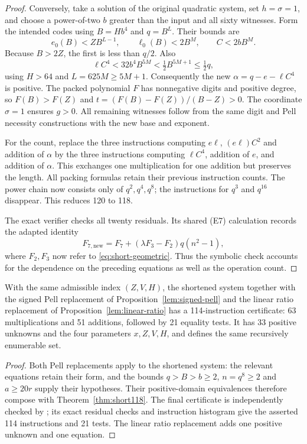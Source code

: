 \begin{proof}
Conversely, take a solution of the original quadratic system, set
$h=\sigma=1$, and choose a power-of-two $b$ greater than the input and
all sixty witnesses. Form the intended codes using $B=Hb^4$ and
$q=B^L$. Their bounds are
\[
 e_0(B)<ZB^{L-1},\qquad \ell_0(B)<2B^M,
 \qquad C<2bB^M.
\]
Because $B>2Z$, the first is less than $q/2$. Also
\[
 \ell C^4<32b^4B^{5M}
       <\tfrac12 B^{5M+1}\le\tfrac12q,
\]
using $H>64$ and $L=625M\ge5M+1$. Consequently the new
$\alpha=q-e-\ell C^4$ is positive. The packed polynomial $F$ has
nonnegative digits and positive degree, so $F(B)>F(Z)$ and
$t=(F(B)-F(Z))/(B-Z)>0$. The coordinate $\sigma=1$ ensures $g>0$.
All remaining witnesses follow from the same digit and Pell necessity
constructions with the new base and exponent.

For the count, replace the three instructions computing $e\ell$,
$(e\ell)C^2$ and addition of $\alpha$ by the three instructions
computing $\ell C^4$, addition of $e$, and addition of $\alpha$.
This exchanges one multiplication for one addition but preserves the
length. All packing formulas retain their previous instruction counts.
The power chain now consists only of $q^2,q^4,q^8$; the instructions
for $q^3$ and $q^{16}$ disappear. This reduces 120 to 118.

The exact verifier checks all twenty residuals. Its shared (E7)
calculation records the adapted identity
\[
 F_{7,\mathrm{new}}=F_7+(\lambda F_3-F_2)q(n^2-1),
\]
where $F_2,F_3$ now refer to
\eqref{eq:short-geometric}. Thus the symbolic check accounts for the
dependence on the preceding equations as well as the operation count.
\end{proof}

\begin{corollary}\label{thm:best114}
With the same admissible index $(Z,V,H)$, the shortened system together
with the signed Pell replacement of Proposition~\ref{lem:signed-pell} and the
linear ratio replacement of Proposition~\ref{lem:linear-ratio} has a
114-instruction certificate: 63 multiplications and 51 additions,
followed by 21 equality tests. It has 33 positive unknowns and the four
parameters $x,Z,V,H$, and defines the same recursively enumerable set.
\end{corollary}

\begin{proof}
Both Pell replacements apply to the shortened system: the relevant
equations retain their form, and the bounds $q>B>b\ge2$, $n=q^8\ge2$
and $a\ge20r$ supply their hypotheses. Their positive-domain equivalences
therefore compose with Theorem~\ref{thm:short118}. The final certificate
is independently checked by
; its exact residual checks and
instruction histogram give the asserted 114 instructions and 21 tests.
The linear ratio replacement adds one positive unknown and one equation.
\end{proof}

